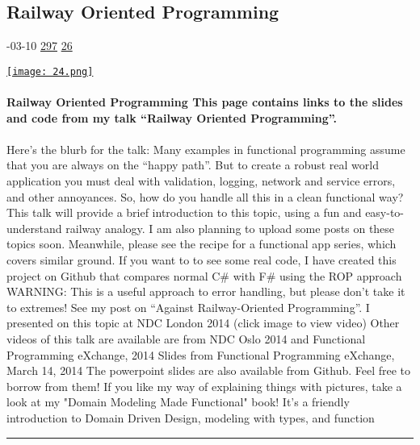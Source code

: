 \documentclass[10pt,a4paper]{article}
\begin{document}
\begin{multicols*}{2}
\begin{minipage}{\linewidth}
\subsection{Railway Oriented Programming}
\textsc{\footnotesize
{\scriptsize\faCalendar}-03-10 
{\scriptsize\faThumbsOUp}\space 
\href{http://news.ycombinator.com/item?id=37171943\&utm\_term=comment}{297} 
{\scriptsize\faComments}\space 
\href{http://news.ycombinator.com/item?id=37171943\&utm\_term=comment}{26} 
}
\par\medskip\noindent
\href{https://fsharpforfunandprofit.com/rop/?utm\_source=hackernewsletter\&utm\_medium=email\&utm\_term=code}{
    \texttt{[image: 24.png]}
}
\end{minipage}
\paragraph{}
\textbf{Railway Oriented Programming
This page contains links to the slides and code from my talk “Railway Oriented Programming”.}
\paragraph{}

Here’s the blurb for the talk:
Many examples in functional programming assume that you are always on the “happy path”. But to create a robust real world application you must deal with validation, logging, network and service errors, and other annoyances.
So, how do you handle all this in a clean functional way?
This talk will provide a brief introduction to this topic, using a fun and easy-to-understand railway analogy.
I am also planning to upload some posts on these topics soon. Meanwhile, please see the recipe for a functional app series, which covers similar ground.
If you want to to see some real code, I have created this project on Github that compares normal C\# with F\# using the ROP approach
WARNING: This is a useful approach to error handling, but please don’t take it to extremes! See my post on “Against Railway-Oriented Programming”.
I presented on this topic at NDC London 2014 (click image to view video)
Other videos of this talk are available are from NDC Oslo 2014 and Functional Programming eXchange, 2014
Slides from Functional Programming eXchange, March 14, 2014
The powerpoint slides are also available from Github. Feel free to borrow from them!
If you like my way of explaining things with pictures, take a look at my "Domain Modeling Made Functional" book! It's a friendly introduction to Domain Driven Design, modeling with types, and function
\par\noindent\textcolor{red}{\rule{\linewidth}{0.2mm}}
\vfill
\null
\noindent\begin{minipage}{\linewidth}

\end{minipage}
\end{multicols*}
\end{document}
